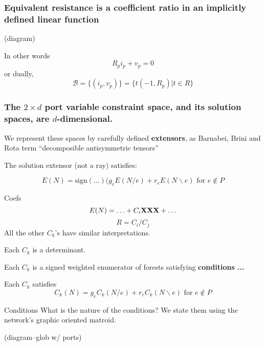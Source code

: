 \documentclass{beamer}
\begin{document}
\begin{frame}
\frametitle{Equivalent resistance is a coefficient ratio in an 
implicitly defined linear function}

(diagram)

In other words
\[
R_pi_p + v_p = 0
\]
or dually,
\[
\mathcal{B} = \{(i_p,v_p)\}
= \{ t(-1, R_p) | t\in R\}
\]

\end{frame}


\begin{frame}
\frametitle{The $2\times d$ port variable constraint space, 
and its solution spaces, are $d$-dimensional.}

We represent these spaces by carefully defined
\textbf{extensors}, as Barnabei, Brini and Rota \cite{exteriorCalc}
term ``decomposible antisymmetric tensors''

The solution extensor (not a ray) satisfies:

\[
E(N) = \text{sign}(...)(g_e E(N/e) + r_e E(N\backslash e)
\text{\ for\ }e\not\in P
\]

\end{frame}



\begin{frame}{Coefs}
\[
E(N) = \ldots + C_i\mbox{\bf XXX} + \ldots
\]
\[
R = C_i/C_j
\]
All the other $C_k$'s have similar interpretations.

Each $C_k$ is a determinant.

Each $C_k$ is a signed weighted enumerator of
forests satisfying \textbf{conditions ...}

Each $C_k$ satisfies
\[
C_k(N) = g_e C_k(N/e) + r_e C_k(N\backslash e)
\text{\ for\ }e\not\in {P}
\]

\end{frame}

\begin{frame}{Conditions}
What is the nature of the conditions?  We state them using the 
network's graphic oriented matroid.

(diagram--glob w/ ports)

\end{frame}





\end{document}

